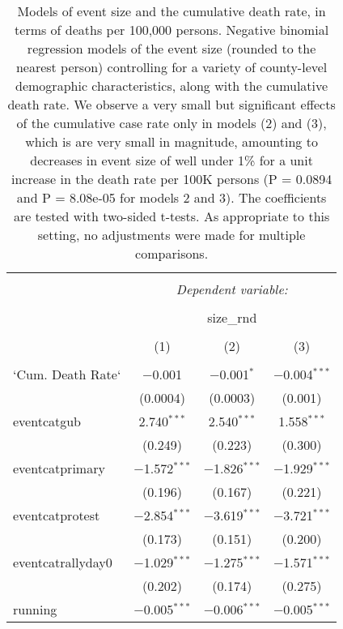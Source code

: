 
\begin{table}[!htbp] \centering 
  \caption{Models of event size and the cumulative death rate, in terms of deaths per 100,000 persons. Negative binomial regression models of the event size (rounded to the nearest person) controlling for a variety of county-level demographic characteristics, along with the cumulative death rate. We observe a very small but significant effects of the cumulative case rate only in models (2) and (3), which is are very small in magnitude, amounting to decreases in event size of well under 1\% for a unit increase in the death rate per 100K persons (P = 0.0894 and P = 8.08e-05 for models 2 and 3). The coefficients are tested with two-sided t-tests. As appropriate to this setting, no adjustments were made for multiple comparisons.} 
  \label{tbl-death} 
\tiny 
\begin{tabular}{@{\extracolsep{5pt}}lccc} 
\\[-1.8ex]\hline 
\hline \\[-1.8ex] 
 & \multicolumn{3}{c}{\textit{Dependent variable:}} \\ 
\cline{2-4} 
\\[-1.8ex] & \multicolumn{3}{c}{size\_rnd} \\ 
\\[-1.8ex] & (1) & (2) & (3)\\ 
\hline \\[-1.8ex] 
 `Cum. Death Rate` & $-$0.001 & $-$0.001$^{*}$ & $-$0.004$^{***}$ \\ 
  & (0.0004) & (0.0003) & (0.001) \\ 
  eventcatgub & 2.740$^{***}$ & 2.540$^{***}$ & 1.558$^{***}$ \\ 
  & (0.249) & (0.223) & (0.300) \\ 
  eventcatprimary & $-$1.572$^{***}$ & $-$1.826$^{***}$ & $-$1.929$^{***}$ \\ 
  & (0.196) & (0.167) & (0.221) \\ 
  eventcatprotest & $-$2.854$^{***}$ & $-$3.619$^{***}$ & $-$3.721$^{***}$ \\ 
  & (0.173) & (0.151) & (0.200) \\ 
  eventcatrallyday0 & $-$1.029$^{***}$ & $-$1.275$^{***}$ & $-$1.571$^{***}$ \\ 
  & (0.202) & (0.174) & (0.275) \\ 
  running & $-$0.005$^{***}$ & $-$0.006$^{***}$ & $-$0.005$^{***}$ \\ 

\end{tabular}
\end{table}

